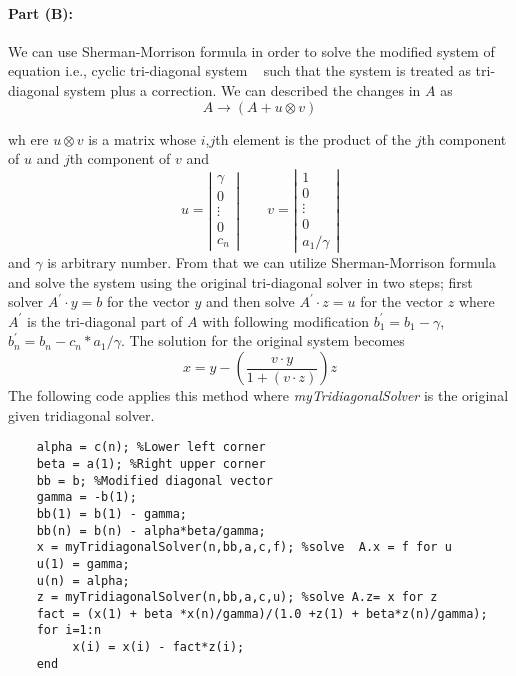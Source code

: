 \paragraph{Part (B):}
We can use Sherman-Morrison formula in order to solve the modified system of equation i.e., cyclic tri-diagonal system ~\cite{press1987numerical} such that the system is treated as tri-diagonal system plus a correction. We can described the changes in $A$ as 
$$A \rightarrow (A + u \otimes v) $$

wh	ere $u \otimes v$ is a matrix whose $i$,$j$th element is the product of the $j$th component of $u$ and $j$th component of $v$ and 
\[
u = \left| 
\begin{array}{c}
\gamma \\
0\\
\vdots\\
0\\
c_{n}
\end{array} 
\right| \quad \quad
v = \left| 
\begin{array}{c}
1 \\
0\\
\vdots\\
0\\
a_{1}/\gamma
\end{array} 
\right|  
\]
and $\gamma$ is arbitrary number. From that we can utilize Sherman-Morrison formula and solve the system using the original tri-diagonal solver in two steps; first solver $A^{\prime}\cdot y = b$ for the vector $y$ and then solve $A^{\prime}\cdot z = u$ for the vector $z$ where $A^{\prime}$ is the tri-diagonal part of $A$ with following modification $b_{1}^{\prime}=b_{1}-\gamma$, $b_{n}^{\prime}= b_{n}-c_{n}*a_{1}/\gamma$. The solution for the original system becomes 
\[
x = y - \left( \frac{v \cdot y}{1+\left( v\cdot z \right)} \right) z 
\]
The following code applies this method where \emph{myTridiagonalSolver} is the original given tridiagonal solver.
\begin{lstlisting}
	alpha = c(n); %Lower left corner
	beta = a(1); %Right upper corner
	bb = b; %Modified diagonal vector
	gamma = -b(1);
	bb(1) = b(1) - gamma;
	bb(n) = b(n) - alpha*beta/gamma;
	x = myTridiagonalSolver(n,bb,a,c,f); %solve  A.x = f for u 
	u(1) = gamma;
	u(n) = alpha;
	z = myTridiagonalSolver(n,bb,a,c,u); %solve A.z= x for z
	fact = (x(1) + beta *x(n)/gamma)/(1.0 +z(1) + beta*z(n)/gamma);
	for i=1:n
   		 x(i) = x(i) - fact*z(i);
	end
\end{lstlisting}